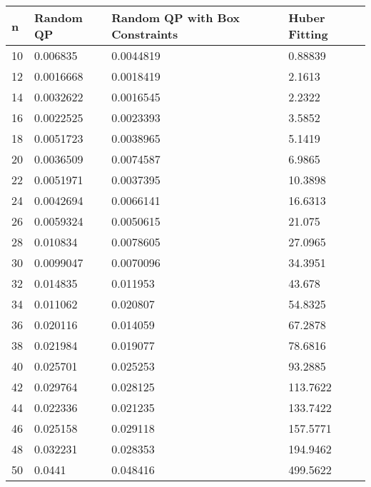\begin{tabular}{llll}
n & Random QP & Random QP with Box Constraints & Huber Fitting \\ 
\hline 
10 & 0.006835 & 0.0044819 & 0.88839 \\ 
12 & 0.0016668 & 0.0018419 & 2.1613 \\ 
14 & 0.0032622 & 0.0016545 & 2.2322 \\ 
16 & 0.0022525 & 0.0023393 & 3.5852 \\ 
18 & 0.0051723 & 0.0038965 & 5.1419 \\ 
20 & 0.0036509 & 0.0074587 & 6.9865 \\ 
22 & 0.0051971 & 0.0037395 & 10.3898 \\ 
24 & 0.0042694 & 0.0066141 & 16.6313 \\ 
26 & 0.0059324 & 0.0050615 & 21.075 \\ 
28 & 0.010834 & 0.0078605 & 27.0965 \\ 
30 & 0.0099047 & 0.0070096 & 34.3951 \\ 
32 & 0.014835 & 0.011953 & 43.678 \\ 
34 & 0.011062 & 0.020807 & 54.8325 \\ 
36 & 0.020116 & 0.014059 & 67.2878 \\ 
38 & 0.021984 & 0.019077 & 78.6816 \\ 
40 & 0.025701 & 0.025253 & 93.2885 \\ 
42 & 0.029764 & 0.028125 & 113.7622 \\ 
44 & 0.022336 & 0.021235 & 133.7422 \\ 
46 & 0.025158 & 0.029118 & 157.5771 \\ 
48 & 0.032231 & 0.028353 & 194.9462 \\ 
50 & 0.0441 & 0.048416 & 499.5622 \\ 
\hline 
\end{tabular}